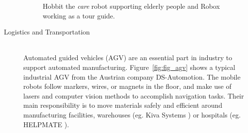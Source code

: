 \begin{description}
\begin{figure}[thpb]
	  \myfloatalign
      \footnotesize
      \centering
   \caption[Assitance robots]{Hobbit the \emph{care} robot supporting elderly people and Robox working as a tour guide.}
   \label{fig:fig_assist}
\end{figure}

\item[Logistics and Transportation]\hfill \\
Automated guided vehicles (AGV) are an essential part in industry to support automated manufacturing. Figure~\ref{fig:fig_agv} shows a typical industrial AGV from the Austrian company DS-Automotion.
The mobile robots follow markers, wires, or magnets in the floor, and make use of lasers and computer vision methods to accomplish navigation tasks. 
Their main responsibility is to move materials safely and efficient around manufacturing facilities, warehouses (eg. Kiva Systems \cite{kiva}) or hospitals (eg. HELPMATE \cite{ROB:4520696}). 


\end{description}
